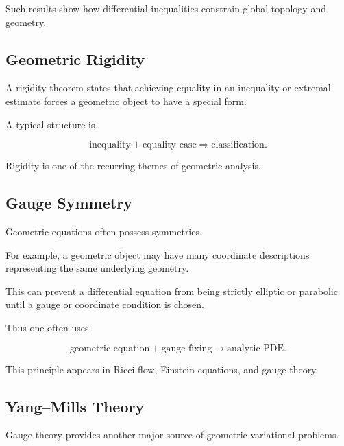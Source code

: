 Such results show how differential inequalities constrain global
topology and geometry.

\subsection{Geometric Rigidity}
\label{subsec:geometric-rigidity}

A rigidity theorem states that achieving equality in an inequality or
extremal estimate forces a geometric object to have a special form.

A typical structure is

\[
\boxed{
\text{inequality}
+
\text{equality case}
\Longrightarrow
\text{classification}.
}
\]

Rigidity is one of the recurring themes of geometric analysis.

\subsection{Gauge Symmetry}
\label{subsec:geometric-gauge-symmetry}

Geometric equations often possess symmetries.

For example, a geometric object may have many coordinate descriptions
representing the same underlying geometry.

This can prevent a differential equation from being strictly elliptic or
parabolic until a gauge or coordinate condition is chosen.

Thus one often uses

\[
\boxed{
\text{geometric equation}
+
\text{gauge fixing}
\longrightarrow
\text{analytic PDE}.
}
\]

This principle appears in Ricci flow, Einstein equations, and gauge
theory.

\subsection{Yang--Mills Theory}
\label{subsec:yang-mills-geometric-analysis}

Gauge theory provides another major source of geometric variational
problems.

